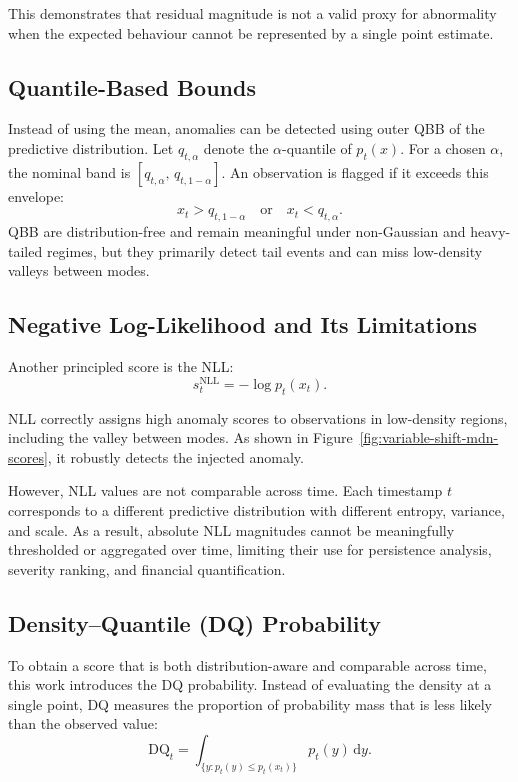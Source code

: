 This demonstrates that residual magnitude is not a valid proxy for abnormality when the expected behaviour cannot be represented by a single point estimate.

\subsection{Quantile-Based Bounds}
\label{subsec:quantile-bounds}
Instead of using the mean, anomalies can be detected using outer \ac{QBB} of the
predictive distribution. Let $q_{t,\alpha}$ denote the $\alpha$-quantile of $p_t(x)$.
For a chosen $\alpha$, the nominal band is $[q_{t,\alpha},\, q_{t,1-\alpha}]$. An
observation is flagged if it exceeds this envelope:
\[
x_t > q_{t,1-\alpha} \quad \text{or} \quad x_t < q_{t,\alpha}.
\]
\ac{QBB} are distribution-free and remain meaningful under non-Gaussian and
heavy-tailed regimes, but they primarily detect tail events and can miss low-density
valleys between modes.

\subsection{Negative Log-Likelihood and Its Limitations}

Another principled score is the \ac{NLL}:
\begin{equation}
	s_t^{\text{NLL}} = -\log p_t(x_t).
\end{equation}

\ac{NLL} correctly assigns high anomaly scores to observations in low-density regions, including the valley between modes. As shown in Figure~\ref{fig:variable-shift-mdn-scores}, it robustly detects the injected anomaly.

However, \ac{NLL} values are {not comparable across time}. Each timestamp $t$ corresponds to a different predictive distribution with different entropy, variance, and scale. As a result, absolute \ac{NLL} magnitudes cannot be meaningfully thresholded or aggregated over time, limiting their use for persistence analysis, severity ranking, and financial quantification.

\subsection{Density--Quantile (DQ) Probability}

To obtain a score that is both distribution-aware and comparable across time, this work introduces the \ac{DQ} probability. Instead of evaluating the density at a single point, \ac{DQ} measures the proportion of probability mass that is {less likely} than the observed value:
\begin{equation}
	\text{DQ}_t = \int_{\{y : p_t(y) \leq p_t(x_t)\}} p_t(y)\, \mathrm{d}y.
\end{equation}

